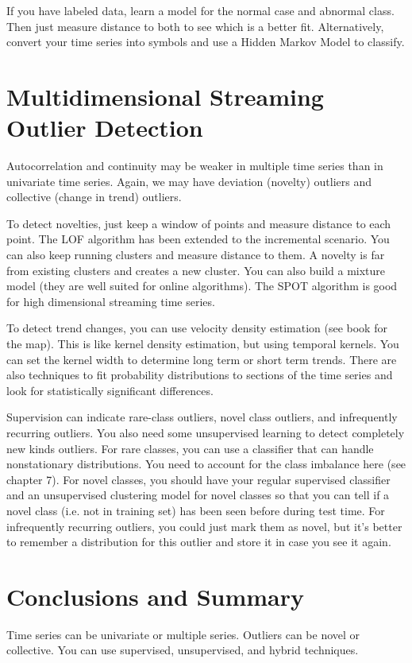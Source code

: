 \documentclass[a4paper]{article}
\begin{document}
If you have labeled data, learn a model for the normal case and abnormal class.
Then just measure distance to both to see which is a better fit. Alternatively,
convert your time series into symbols and use a Hidden Markov Model to classify.

\section{Multidimensional Streaming Outlier Detection}
Autocorrelation and continuity may be weaker in multiple time series than
in univariate time series. Again, we may have deviation (novelty) outliers
and collective (change in trend) outliers.

To detect novelties, just keep a window of points and measure distance to
each point. The LOF algorithm has been extended to the incremental scenario.
You can also keep running clusters and measure distance to them. A novelty
is far from existing clusters and creates a new cluster. You can also build a
mixture model (they are well suited for online algorithms). The SPOT algorithm
is good for high dimensional streaming time series.

To detect trend changes, you can use velocity density estimation (see book
for the map). This is like kernel density estimation, but using temporal
kernels. You can set the kernel width to determine long term or short term
trends. There are also techniques to fit probability distributions to sections
of the time series and look for statistically significant differences.

Supervision can indicate rare-class outliers, novel class outliers, and
infrequently recurring outliers. You also need some unsupervised learning to
detect completely new kinds outliers. For rare classes, you can use a classifier
that can handle nonstationary distributions. You need to account for the class
imbalance here (see chapter 7). For novel classes, you should have your regular
supervised classifier and an unsupervised clustering model for novel classes
so that you can tell if a novel class (i.e. not in training set) has been
seen before during test time. For infrequently recurring outliers, you could
just mark them as novel, but it's better to remember a distribution for this
outlier and store it in case you see it again.

\section{Conclusions and Summary}
Time series can be univariate or multiple series. Outliers can be novel or
collective. You can use supervised, unsupervised, and hybrid techniques.
\end{document}
